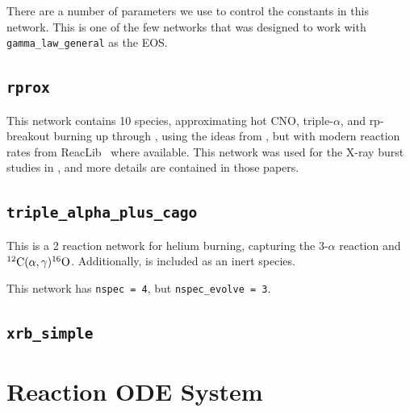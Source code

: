 There are a number of parameters we use to control the constants in
this network.  This is one of the few networks that was designed
to work with {\tt gamma\_law\_general} as the EOS.

\subsection{{\tt rprox}}

This network contains 10 species, approximating hot CNO,
triple-$\alpha$, and rp-breakout burning up through ,
using the ideas from \cite{wallacewoosley:1981}, but with modern
reaction rates from {\sf ReacLib}~\cite{ReacLib} where available.
This network was used for the X-ray burst studies in
\cite{xrb:II,xrb:III}, and more details are contained in those papers.


\subsection{{\tt triple\_alpha\_plus\_cago}}

This is a 2 reaction network for helium burning, capturing the $3$-$\alpha$
reaction and $\isotm{C}{12}(\alpha,\gamma)\isotm{O}{16}$.  Additionally,
 is included as an inert species.

This network has {\tt nspec = 4}, but {\tt nspec\_evolve = 3}.



\subsection{{\tt xrb\_simple}}



\section{Reaction ODE System}

